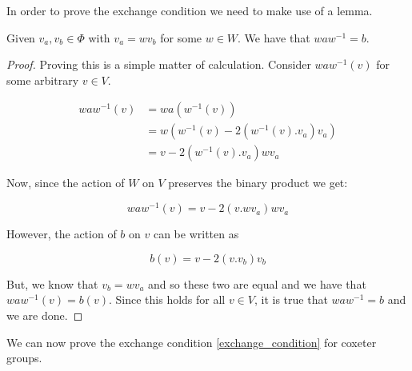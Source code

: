 \documentclass[a4paper,12pt]{article}
\begin{document}
In order to prove the exchange condition we need to make use of a lemma.

\begin{lem}
	\label{conjugate_lemma}
	Given $v_a, v_b \in \Phi$ with $v_a = wv_b$ for some $w \in W$. We have that $waw^{-1} = b$.
\end{lem}

\begin{proof}
	Proving this is a simple matter of calculation. Consider $waw^{-1}(v)$ for some arbitrary $v \in V$.
	
	\begin{align*}
		waw^{-1}(v) &= wa(w^{-1}(v)) \\
		&=w(w^{-1}(v) - 2(w^{-1}(v).v_a)v_a) \\
		&=v - 2(w^{-1}(v).v_a)wv_a
	\end{align*}
	
	Now, since the action of $W$ on $V$ preserves the binary product we get:
	
	\[waw^{-1}(v) = v - 2(v.wv_a)wv_a\]
	
	However, the action of $b$ on $v$ can be written as
	
	\[b(v) = v - 2(v.v_b)v_b\]
	
	But, we know that $v_b = wv_a$ and so these two are equal and we have that $waw^{-1}(v) = b(v)$. Since this holds for all $v \in V$, it is true that $waw^{-1} = b$ and we are done.
\end{proof}

We can now prove the exchange condition \ref{exchange_condition} for coxeter groups.
\end{document}
